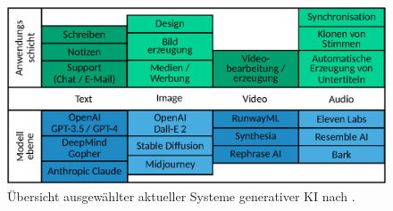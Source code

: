\begin{figure}[htb]
    \centering
    \includegraphics[width=\textwidth]{chapter/chapter_2/generative-ai-landscape.eps}
    \caption{Übersicht ausgewählter aktueller Systeme generativer KI nach \cite{sequoia-genai}.}
    \label{sec2:sota:subsec:fz-explainablity:fig:generative-ai-landscape}
\end{figure}


